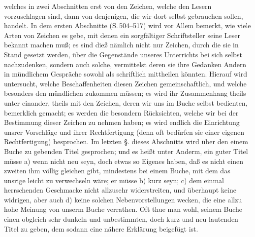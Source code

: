 welches in zwei Abschnitten erst von den Zeichen, welche den Lesern vorzuschlagen sind, dann von denjenigen, die wir dort selbst gebrauchen sollen, handelt. In dem ersten Abschnitte (S.\,504--517) wird vor Allem bemerkt, wie viele Arten von Zeichen es gebe, mit denen ein sorgfältiger Schriftsteller seine Leser bekannt machen muß; es sind dieß nämlich nicht nur Zeichen, durch die sie in Stand  gesetzt werden, über die Gegenstände unseres Unterrichts bei sich selbst nachzudenken, sondern auch solche, vermittelst deren sie ihre Gedanken Andern in mündlichem Gespräche sowohl als schriftlich mittheilen könnten. Hierauf wird untersucht, welche Beschaffenheiten diesen Zeichen gemeinschaftlich, und welche besonders den mündlichen zukommen müssen; es wird ihr Zusammenhang theils unter einander, theils mit den Zeichen, deren wir uns im Buche selbst bedienten, bemerklich gemacht; es werden die besondern Rücksichten, welche wir bei der Bestimmung dieser Zeichen zu nehmen haben; es wird endlich die Einrichtung unsrer Vorschläge und ihrer Rechtfertigung (denn oft bedürfen sie einer eigenen Rechtfertigung) besprochen. Im letzten §. dieses Abschnitts wird über den einem Buche zu gebenden Titel gesprochen; und es heißt unter Anderm, ein guter Titel müsse a) wenn nicht neu seyn, doch etwas so Eigenes haben, daß es nicht einen zweiten ihm völlig gleichen gibt, mindestens bei einem Buche, mit dem das unsrige leicht zu verwechseln wäre; er müsse b) kurz seyn; c) dem einmal herrschenden Geschmacke nicht allzusehr widerstreiten, und überhaupt keine widrigen, aber auch d) keine solchen Nebenvorstellungen wecken, die eine allzu hohe Meinung von unserm Buche verrathen. Oft thue man wohl, seinem Buche einen obgleich sehr dunkeln und unbestimmten, doch kurz und neu lautenden Titel zu geben, dem sodann eine nähere Erklärung beigefügt ist. \par 
